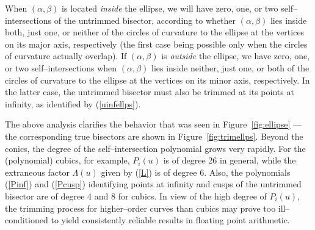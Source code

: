 \begin{exmpl}
{When $(\alpha,\beta)$ is located {\it inside\/} the ellipse, we will
have zero, one, or two self--intersections of the untrimmed bisector,
according to whether $(\alpha,\beta)$ lies inside both, just one, or
neither of the circles of curvature to the ellipse at the vertices on
its major axis, respectively (the first case being possible only when
the circles of curvature actually overlap). If $(\alpha,\beta)$ is {\it
outside\/} the ellipse, we have zero, one, or two self--intersections
when $(\alpha,\beta)$ lies inside neither, just one, or both of the
circles of curvature to the ellipse at the vertices on its minor axis,
respectively. In the latter case, the untrimmed bisector must also be
trimmed at its points at infinity, as identified by (\ref{uinfellps}).
}
\end{exmpl}

The above analysis clarifies the behavior that was seen in
Figure~\ref{fig:ellipse} --- the corresponding true bisectors are
shown in Figure~\ref{fig:trimellps}.
Beyond the conics, the degree of the self--intersection polynomial
grows very rapidly. For the (polynomial) cubics, for example,
$P_i(u)$ is of degree 26 in general, while the
extraneous factor $\Lambda(u)$ given by (\ref{L}) is of degree 6. Also,
the polynomials (\ref{Pinf}) and (\ref{Pcusp}) identifying
points at infinity and cusps of the untrimmed bisector are of degree
4 and 8 for cubics.
In view of the high degree of $P_i(u)$, the trimming process
for higher--order curves than cubics may prove too ill--conditioned
to yield consistently reliable results in floating point arithmetic.




